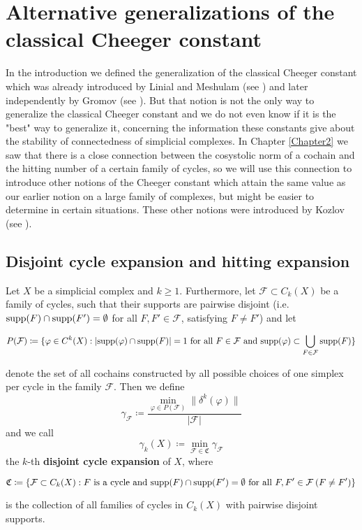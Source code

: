 
\chapter{Alternative generalizations of the classical Cheeger constant}

\label{Chapter6}

In the introduction we defined the generalization of the classical Cheeger constant which was already introduced by Linial and Meshulam (see \cite{2}) and later independently by Gromov (see \cite{3}). But that notion is not the only way to generalize the classical Cheeger constant and we do not even know if it is the "best" way to generalize it, concerning the information these constants give about the stability of connectedness of simplicial complexes. In Chapter \ref{Chapter2} we saw that there is a close connection between the cosystolic norm of a cochain and the hitting number of a certain family of cycles, so we will use this connection to introduce other notions of the Cheeger constant which attain the same value as our earlier notion on a large family of complexes, but might be easier to determine in certain situations. These other notions were introduced by Kozlov (see \cite{13}).

\section{Disjoint cycle expansion and hitting expansion}

\begin{defi}\label{definition411}
Let \(X\) be a simplicial complex and \(k\geq 1\). Furthermore, let \(\mathcal{F}\subset C_k(X)\) be a family of cycles, such that their supports are pairwise disjoint (i.e. \(\mathrm{supp}(F)\cap\mathrm{supp}(F')=\emptyset\) for all \(F,F'\in\mathcal{F}\), satisfying \(F\neq F'\)) and let
\begin{small}
\[
P(\mathcal{F})\coloneqq\{\varphi\in C^k(X):|\mathrm{supp}(\varphi)\cap\mathrm{supp}(F)|=1\text{ for all }F\in\mathcal{F}\text{ and }\mathrm{supp}(\varphi)\subset\bigcup\limits_{F\in\mathcal{F}}\mathrm{supp}(F)\}
\]
\end{small}
denote the set of all cochains constructed by all possible choices of one simplex per cycle in the family \(\mathcal{F}\). Then we define
\[
\gamma_{\mathcal{F}}\coloneqq\frac{\min\limits_{\varphi\in P(\mathcal{F})}\|\delta^k(\varphi)\|}{|\mathcal{F}|}
\]
and we call
\[
\gamma_k(X)\coloneqq\min\limits_{\mathcal{F}\in\mathfrak{C}}\gamma_{\mathcal{F}}
\]
the \(k\)-th \textbf{disjoint cycle expansion} of \(X\), where
\begin{small}
\[
\mathfrak{C}\coloneqq\{\mathcal{F}\subset C_k(X):F\text{ is a cycle and }\mathrm{supp}(F)\cap\mathrm{supp}(F')=\emptyset\text{ for all }F,F'\in\mathcal{F}\:(F\neq F')\}
\]
\end{small}
is the collection of all families of cycles in \(C_k(X)\) with pairwise disjoint supports.
\end{defi}


